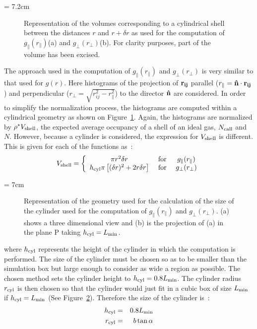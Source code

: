 \picW = 7.2cm
\begin{figure}
	\centering
	\caption{Representation of the volumes corresponding to a cylindrical shell between the
	distances $r$ and $r+\delta r$ as used for the computation of 
	$g_\parallel(r_\parallel)$(a) and $g_\perp(r_\perp)$(b). For clarity
	purposes, part of the volume has been excised.}
	\label{fig:gp(r)CylinderShells}
\end{figure}

The approach used in the computation of $g_\parallel(r_\parallel)$ and $g_\perp(r_\perp)$ is 
very similar to that used for
$g(r)$. Here histograms of the projection of $\mathbf{r_{ij}}$
parallel ($r_\parallel = \mathbf{\hat{n} } \cdot \mathbf{r_{ij}}$) and perpendicular 
($r_\perp = \sqrt{r_{ij}^2 - r_\parallel^2 }$) to the director $\mathbf{\hat{n} }$ are considered. In
order to simplify the normalization process, the histograms are computed within a cylindrical
geometry as shown on Figure~\ref{fig:gp(r)CylinderShells}. Again, the histograms are normalized
by $\rho^{*}V_{\mathrm{shell}}$, the expected average occupancy of a shell of an ideal gas, 
$N_{\mathrm{call}}$ and $N$. However, because a cylinder is considered, the expression for
$V_{\mathrm{shell}}$ is different. This is given for each of the functions as~:
%
\begin{equation}
V_\mrm{shell} = \left\{ %
\begin{array}{ccc}
	\pi r^2 \delta r	 &\mrm{\ for\ } &g_\parallel(r_\parallel)	\\
	h_\mrm{cyl} \pi \left[ (\delta r)^2 + 2r\delta r  \right] &\mrm{\ for\ } &g_\perp(r_\perp)	
\end{array}
\right.
\end{equation}

\picW = 7cm
\begin{figure}
	\caption{Representation of the geometry used for the calculation of the size of the
	cylinder used for the computation of $g_\parallel(r_\parallel)$ and $g_\perp(r_\perp)$. 
	(a) shows a three dimensional view and (b) is the projection  of (a) in the plane 
	P taking $h_{\mathrm{cyl}}=L_{\mathrm{min}}$.}
	\label{fig:cylGeometry}
\end{figure}

where $h_{\mathrm{cyl}}$ represents the height of the cylinder in which the computation is performed.
The size of the cylinder must be chosen so as to be smaller than the simulation box but large
enough to consider as wide a region as possible. The chosen method sets the cylinder height
to $h_{\mathrm{cyl}} = 0.8L_{\mathrm{min}}$. The cylinder radius $r_{\mathrm{cyl}}$ is then chosen so that 
the cylinder would just fit in a cubic box of size $L_{\mathrm{min}}$ if $h_{\mathrm{cyl}} = L_{\mathrm{min}}$
(See Figure~\ref{fig:cylGeometry}). Therefore the size of the cylinder is~:
\begin{eqnarray}
	h_{\mathrm{cyl}} &=& 0.8 L_{\mathrm{min}}	\\
	r_{\mathrm{cyl}} &=& b\tan\alpha	
\end{eqnarray}

